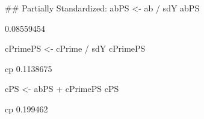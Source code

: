 \begin{Schunk}
\begin{Sinput}
 ## Partially Standardized:
 abPS <- ab / sdY
 abPS
\end{Sinput}
\begin{Soutput}
[1] 0.08559454
\end{Soutput}
\begin{Sinput}
 cPrimePS <- cPrime / sdY
 cPrimePS
\end{Sinput}
\begin{Soutput}
       cp 
0.1138675 
\end{Soutput}
\begin{Sinput}
 cPS <- abPS + cPrimePS
 cPS
\end{Sinput}
\begin{Soutput}
      cp 
0.199462 
\end{Soutput}
\end{Schunk}
